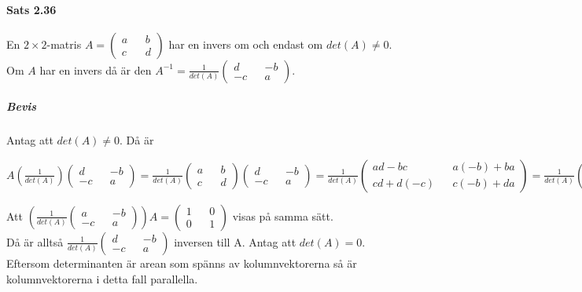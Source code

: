 \paragraph{Sats 2.36} En $2\times 2$-matris $A=\begin{pmatrix}a&&b\\c&&d\end{pmatrix}$ har en invers om och endast om $det(A)\neq 0$.
Om $A$ har en invers då är den $A^{-1}=\frac{1}{det(A)}\begin{pmatrix}d&&-b\\-c&&a\end{pmatrix}$.
\subparagraph{Bevis} Antag att $det(A)\neq 0$. Då är
\begin{center}
    $A(\frac{1}{det(A)})\begin{pmatrix}
        d&&-b\\-c&&a
    \end{pmatrix}=
    \frac{1}{det(A)}\begin{pmatrix}
        a&&b\\c&&d
    \end{pmatrix}\begin{pmatrix}
        d&&-b\\-c&&a
    \end{pmatrix}=
    \frac{1}{det(A)}\begin{pmatrix}
        ad-bc&&a(-b)+ba\\cd+d(-c)&&c(-b)+da
    \end{pmatrix}=
    \frac{1}{det(A)}\begin{pmatrix}
        ad-bc&&0\\0&&ad-bc
    \end{pmatrix}=
    \frac{1}{det(A)}\begin{pmatrix}
        det(A)&&0\\0&&det(A)
    \end{pmatrix}=\begin{pmatrix}
        1&&0\\0&&1
    \end{pmatrix}$
\end{center}
Att $(\frac{1}{det(A)}\begin{pmatrix}a&&-b\\-c&&a\end{pmatrix})A=\begin{pmatrix}1&&0\\0&&1\end{pmatrix}$ visas på samma sätt.\\
Då är alltså $\frac{1}{det(A)}\begin{pmatrix}d&&-b\\-c&&a\end{pmatrix}$ inversen till A.
Antag att $det(A)=0$.\\
Eftersom determinanten är arean som spänns av kolumnvektorerna så är kolumnvektorerna i detta fall parallella.

